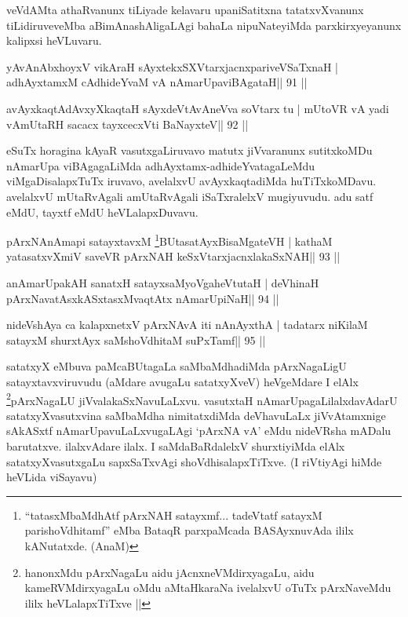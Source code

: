 \begin{artha}
veVdAMta athaRvanunx tiLiyade kelavaru upaniSatitxna tatatxvXvanunx tiLidiruveveMba aBimAnashAligaLAgi bahaLa nipuNateyiMda parxkirxyeyanunx kalipxsi heVLuvaru.
\end{artha}

\begin{shl}
yAvAnAbxhoyxV vikAraH sAyxtekxSXVtarxjacnxpariveVSaTxnaH |
adhAyxtamxM cAdhideYvaM vA nAmarUpaviBAgataH\hfill || 91 ||
\end{shl}

\begin{shl}
avAyxkaqtAdAvxyXkaqtaH sAyxdeVtAvAneVva soV\s tarx tu |
mUtoVR vA yadi vA\s mUtaRH sacacx tayxcecxVti BaNayxteV\hfill || 92 ||
\end{shl}

\begin{artha}
eSuTx horagina kAyaR vasutxgaLiruvavo matutx jiVvaranunx sutitxkoMDu
nAmarUpa viBAgagaLiMda adhAyxtamx-adhideYvatagaLeMdu viMgaDisalapxTuTx
iruvavo, avelalxvU avAyxkaqtadiMda huTiTxkoMDavu. avelalxvU
mUtaRvAgali amUtaRvAgali iSaTxralelxV mugiyuvudu. adu satf eMdU,
tayxtf eMdU heVLalapxDuvavu.
\end{artha}


\begin{shl}
pArxNAnAmapi satayxtavxM \footnote{``tatasxMbaMdhAtf pArxNAH satayxmf... tadeVtatf
  satayxM parishoVdhitamf'' eMba BataqR parxpaMcada BASAyxnuvAda
  ililx kANutatxde. (AnaM)}BUtasatAyxBisaMgateVH |
kathaM yatasatxvXmiV saveVR pArxNAH keSxVtarxjacnxlakaSxNAH\hfill || 93 ||
\end{shl}

\begin{shl}
anAmarUpakAH sanatxH satayxsaMyoVgaheVtutaH |
deVhinaH pArxNavatAsxkASxtasxMvaqtAtx nAmarUpiNaH\hfill || 94 ||
\end{shl}

\begin{shl}
nideVshAya ca kalapxnetxV pArxNAvA iti  nAnAyxthA |
tadatarx niKilaM satayxM shurxtAyx saMshoVdhitaM suPxTamf\hfill || 95 ||
\end{shl}

\begin{artha}
satatxyX eMbuva paMcaBUtagaLa saMbaMdhadiMda pArxNagaLigU
satayxtavxviruvudu (aMdare avugaLu satatxyXveV) heVgeMdare I
elAlx \footnote{hanonxMdu pArxNagaLu aidu jAcnxneVMdirxyagaLu, aidu
kameRVMdirxyagaLu oMdu aMtaHkaraNa ivelalxvU oTuTx pArxNaveMdu ililx
heVLalapxTiTxve ||}pArxNagaLU jiVvalakaSxNavuLaLxvu. vasutxtaH
nAmarUpagaLilalxdavAdarU satatxyXvasutxvina saMbaMdha nimitatxdiMda
deVhavuLaLx jiVvAtamxnige sAkASxtf nAmarUpavuLaLxvugaLAgi `pArxNA vA'
eMdu nideVRsha mADalu barutatxve. ilalxvAdare ilalx. I saMdaBaRdalelxV
shurxtiyiMda elAlx satatxyXvasutxgaLu sapxSaTxvAgi
shoVdhisalapxTiTxve. (I riVtiyAgi hiMde heVLida viSayavu) 
\end{artha}

